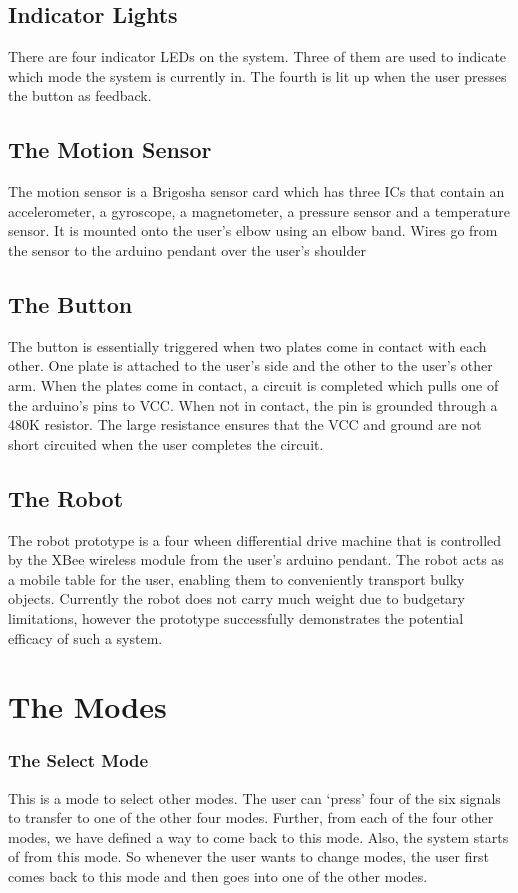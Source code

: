 \documentclass[12pt]{article}
\begin{document}
\subsection{Indicator Lights}
There are four indicator LEDs on the system. Three of them are used to indicate which mode the system is currently in. The fourth is lit up when the user presses the button as feedback.

\subsection{The Motion Sensor}
The motion sensor is a Brigosha sensor card which has three ICs that contain an accelerometer, a gyroscope, a magnetometer, a pressure sensor and a temperature sensor. It is mounted onto the user's elbow using an elbow band. Wires go from the sensor to the arduino pendant over the user's shoulder

\subsection{The Button}
The button is essentially triggered when two plates come in contact with each other. One plate is attached to the user's side and the other to the user's other arm. When the plates come in contact, a circuit is completed which pulls one of the arduino's pins to VCC. When not in contact, the pin is grounded through a 480K resistor. The large resistance ensures that the VCC and ground are not short circuited when the user completes the circuit.

\subsection{The Robot}
The robot prototype is a four wheen differential drive machine that is controlled by the XBee wireless module from the user's arduino pendant. The robot acts as a mobile table for the user, enabling them to conveniently transport bulky objects. Currently the robot does not carry much weight due to budgetary limitations, however the prototype successfully demonstrates the potential efficacy of such a system.

\section{The Modes}
\subsubsection{The Select Mode}
This is a mode to select other modes. The user can `press' four of the six signals to transfer to one of the other four modes. Further, from each of the four other modes, we have defined a way to come back to this mode. Also, the system starts of from this mode. So whenever the user wants to change modes, the user first comes back to this mode and then goes into one of the other modes.
\end{document}
